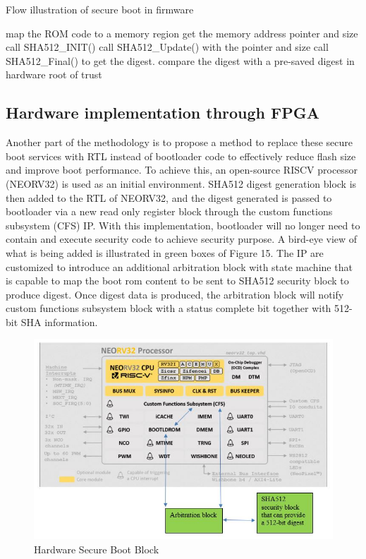 \documentclass[review]{elsarticle}
\begin{document}
\begin{algorithm}
 \caption{Flow illustration of secure boot in firmware}
map the ROM code to a memory region\;
get the memory address pointer and size\;
call SHA512\_INIT()\;
call SHA512\_Update() with the pointer and size\;
call SHA512\_Final() to get the digest.\;
compare the digest with a pre-saved digest in hardware root of trust\;


\end{algorithm}



\subsection{ Hardware implementation through FPGA}
Another part of the methodology is to propose a method to replace these secure boot services with RTL instead of bootloader code to effectively reduce flash size and improve boot performance. To achieve this, an open-source RISCV processor (NEORV32) is used as an initial environment. SHA512 digest generation block is then added to the RTL of NEORV32, and the digest generated is passed to bootloader via a new read only register block through the custom functions subsystem (CFS) IP. With this implementation, bootloader will no longer need to contain and execute security code to achieve security purpose. A bird-eye view of what is being added is illustrated in green boxes of Figure 15. The IP are customized to introduce an additional arbitration block with state machine that is capable to map the boot rom content to be sent to SHA512 security block to produce digest. Once digest data is produced, the arbitration block will notify custom functions subsystem block with a status complete bit together with 512-bit SHA information. 

\begin{figure}[hbt!]
	\centering
	\includegraphics[width=1\textwidth]{figs/HardwareSecureBootBlock.JPG}
	\caption{Hardware Secure Boot Block}
\end{figure}
\end{document}
